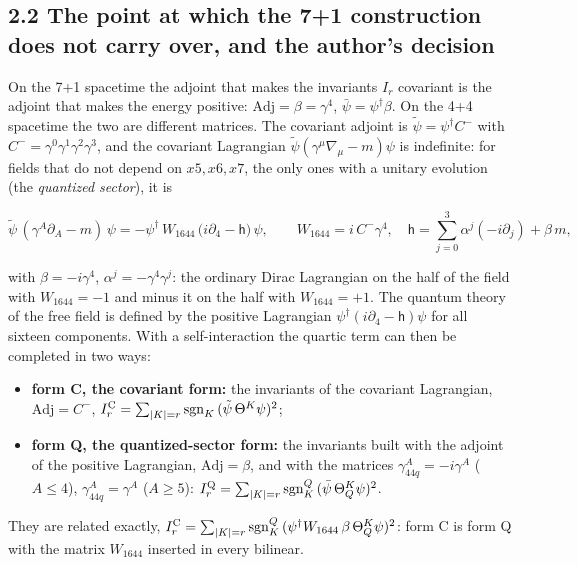 \documentclass[
  10pt,
]{article}
\providecommand{\tightlist}{%
  \setlength{\itemsep}{0pt}\setlength{\parskip}{0pt}}
\begin{document}
\hypertarget{the-point-at-which-the-71-construction-does-not-carry-over-and-the-authors-decision}{%
\subsection{2.2 The point at which the 7+1 construction does not carry
over, and the author's
decision}\label{the-point-at-which-the-71-construction-does-not-carry-over-and-the-authors-decision}}

On the 7+1 spacetime the adjoint that makes the invariants \(I_r\)
covariant is the adjoint that makes the energy positive:
\(\mathrm{Adj}=\beta=\gamma^4\), \(\bar\psi=\psi^\dagger\beta\). On the
4+4 spacetime the two are different matrices. The covariant adjoint is
\(\tilde\psi=\psi^\dagger C^-\) with
\(C^-=\gamma^0\gamma^1\gamma^2\gamma^3\), and the covariant Lagrangian
\(\tilde\psi(\gamma^\mu\nabla_\mu-m)\psi\) is indefinite: for fields
that do not depend on \(x5,x6,x7\), the only ones with a unitary
evolution (the \emph{quantized sector}), it is

\[\tilde\psi\,(\gamma^A\partial_A-m)\,\psi=-\psi^\dagger\,W_{1644}\,\big(i\partial_4-\mathsf h\big)\,\psi,\qquad
W_{1644}=i\,C^-\gamma^4,\quad\mathsf h=\sum_{j=0}^{3}\alpha^j(-i\partial_j)+\beta\,m,\]

with \(\beta=-i\gamma^4\), \(\alpha^j=-\gamma^4\gamma^j\): the ordinary
Dirac Lagrangian on the half of the field with \(W_{1644}=-1\) and minus
it on the half with \(W_{1644}=+1\). The quantum theory of the free
field is defined by the positive Lagrangian
\(\psi^\dagger(i\partial_4-\mathsf h)\psi\) for all sixteen components.
With a self-interaction the quartic term can then be completed in two
ways:

\begin{itemize}
\tightlist
\item
  \textbf{form C, the covariant form:} the invariants of the covariant
  Lagrangian, \(\mathrm{Adj}=C^-\),
  \(I_r^{\rm C}=\sum_{|K|=r}\mathrm{sgn}_K\,(\tilde\psi\,\Theta^K\psi)^2\);
\item
  \textbf{form Q, the quantized-sector form:} the invariants built with
  the adjoint of the positive Lagrangian, \(\mathrm{Adj}=\beta\), and
  with the matrices \(\gamma_{44q}^A=-i\gamma^A\) (\(A\le4\)),
  \(\gamma_{44q}^A=\gamma^A\) (\(A\ge5\)):
  \(I_r^{\rm Q}=\sum_{|K|=r}\mathrm{sgn}_K^Q\,(\bar\psi\,\Theta_Q^K\psi)^2\).
\end{itemize}

They are related exactly,
\(I_r^{\rm C}=\sum_{|K|=r}\mathrm{sgn}_K^Q\,(\psi^\dagger W_{1644}\,\beta\,\Theta_Q^K\psi)^2\):
form C is form Q with the matrix \(W_{1644}\) inserted in every
bilinear.
\end{document}
